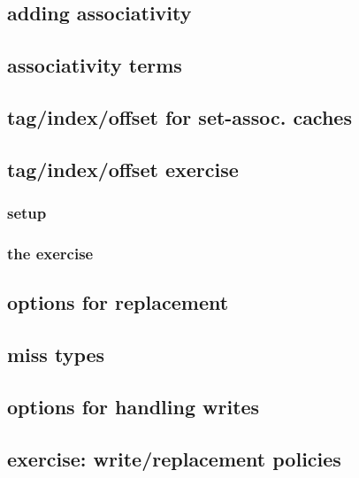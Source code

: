 \subsection{adding associativity}



\subsection{associativity terms}


\subsection{tag/index/offset for set-assoc. caches}


\subsection{tag/index/offset exercise}
\subsubsection{setup}

\subsubsection{the exercise}


\subsection{options for replacement}


\subsection{miss types}


\subsection{options for handling writes}


\subsection{exercise: write/replacement policies}


